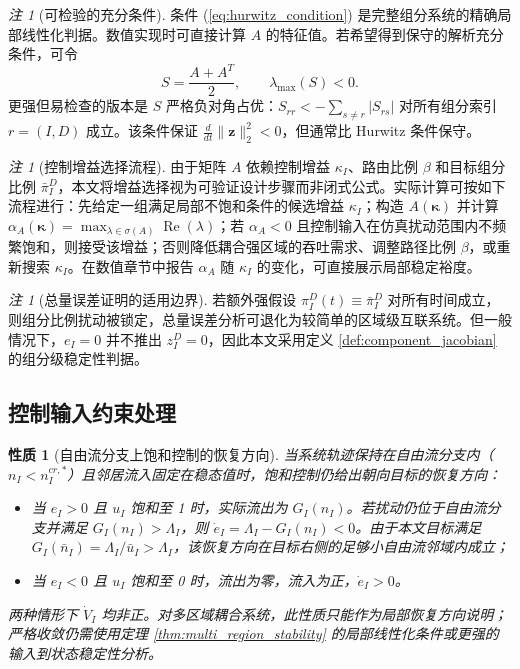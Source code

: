 \documentclass[a4paper,12pt]{article}
\theoremstyle{plain}
\newtheorem{property}[theorem]{性质}
\theoremstyle{definition}
\theoremstyle{remark}
\newtheorem{remark}[theorem]{注}
\begin{document}
\begin{remark}[可检验的充分条件]\label{rem:diagonal_dominance}
条件 (\ref{eq:hurwitz_condition}) 是完整组分系统的精确局部线性化判据。数值实现时可直接计算 $A$ 的特征值。若希望得到保守的解析充分条件，可令
\begin{equation}\label{eq:symmetrized_condition}
    S=\frac{A+A^T}{2},\qquad \lambda_{\max}(S)<0 .
\end{equation}
更强但易检查的版本是 $S$ 严格负对角占优：$S_{rr}<-\sum_{s\ne r}|S_{rs}|$ 对所有组分索引 $r=(I,D)$ 成立。该条件保证 $\frac{d}{dt}\|\bm z\|_2^2<0$，但通常比 Hurwitz 条件保守。
\end{remark}

\begin{remark}[控制增益选择流程]\label{rem:gain_selection}
由于矩阵 $A$ 依赖控制增益 $\kappa_I$、路由比例 $\beta$ 和目标组分比例 $\bar\pi_I^D$，本文将增益选择视为可验证设计步骤而非闭式公式。实际计算可按如下流程进行：先给定一组满足局部不饱和条件的候选增益 $\kappa_I$；构造 $A(\bm\kappa)$ 并计算 $\alpha_A(\bm\kappa)=\max_{\lambda\in\sigma(A)}\operatorname{Re}(\lambda)$；若 $\alpha_A<0$ 且控制输入在仿真扰动范围内不频繁饱和，则接受该增益；否则降低耦合强区域的吞吐需求、调整路径比例 $\beta$，或重新搜索 $\kappa_I$。在数值章节中报告 $\alpha_A$ 随 $\kappa_I$ 的变化，可直接展示局部稳定裕度。
\end{remark}

\begin{remark}[总量误差证明的适用边界]\label{rem:total_error_limitation}
若额外强假设 $\pi_I^D(t)\equiv\bar\pi_I^D$ 对所有时间成立，则组分比例扰动被锁定，总量误差分析可退化为较简单的区域级互联系统。但一般情况下，$e_I=0$ 并不推出 $z_I^D=0$，因此本文采用定义 \ref{def:component_jacobian} 的组分级稳定性判据。
\end{remark}

\subsection{控制输入约束处理}

\begin{property}[自由流分支上饱和控制的恢复方向]\label{prop:saturation_stability}
当系统轨迹保持在自由流分支内（$n_I < n_I^{cr,*}$）且邻居流入固定在稳态值时，饱和控制仍给出朝向目标的恢复方向：
\begin{itemize}
    \item 当 $e_I > 0$ 且 $u_I$ 饱和至 1 时，实际流出为 $G_I(n_I)$。若扰动仍位于自由流分支并满足 $G_I(n_I)>\Lambda_I$，则 $\dot e_I=\Lambda_I-G_I(n_I)<0$。由于本文目标满足 $G_I(\bar n_I)=\Lambda_I/\bar u_I>\Lambda_I$，该恢复方向在目标右侧的足够小自由流邻域内成立；
    \item 当 $e_I < 0$ 且 $u_I$ 饱和至 0 时，流出为零，流入为正，$\dot{e}_I > 0$。
\end{itemize}
两种情形下 $\dot{V}_I$ 均非正。对多区域耦合系统，此性质只能作为局部恢复方向说明；严格收敛仍需使用定理 \ref{thm:multi_region_stability} 的局部线性化条件或更强的输入到状态稳定性分析。
\end{property}
\end{document}
